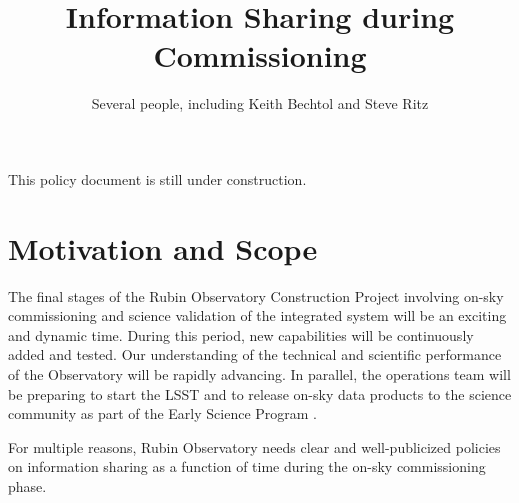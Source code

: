 \documentclass[SE,authoryear,toc,lsstdraft]{lsstdoc}
\title{Information Sharing during Commissioning}
\author{%
Several people, including Keith Bechtol and Steve Ritz
}
\date{\vcsDate}
\begin{document}
\maketitle


\begin{warning}
  This policy document is still under construction.
\end{warning}

\section{Motivation and Scope}

The final stages of the Rubin Observatory Construction Project involving on-sky commissioning and science validation of the integrated system will be an exciting and dynamic time.
During this period, new capabilities will be continuously added and tested. Our understanding of the technical and scientific performance of the Observatory will be rapidly advancing.
In parallel, the operations team will be preparing to start the LSST and to release on-sky data products to the science community as part of the Early Science Program .

For multiple reasons, Rubin Observatory needs clear and well-publicized policies on information sharing as a function of time during the on-sky commissioning phase.
\end{document}
